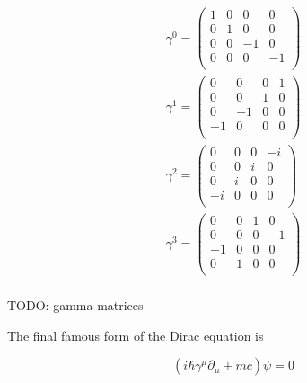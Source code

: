 \begin{equation*}
    \begin{gathered}
        \gamma^{0} = 
         \begin{pmatrix}
          1 & 0 & 0 & 0 \\
          0 & 1 & 0 & 0 \\
          0 & 0 & -1 & 0 \\
          0 & 0 & 0 & -1 \\
         \end{pmatrix} \\
        \gamma^{1} = 
         \begin{pmatrix}
          0 & 0 & 0 & 1 \\
          0 & 0 & 1 & 0 \\
          0 & -1 & 0 & 0 \\
          -1 & 0 & 0 & 0 \\
         \end{pmatrix} \\
        \gamma^{2} = 
         \begin{pmatrix}
          0 & 0 & 0 & -i \\
          0 & 0 & i & 0 \\
          0 & i & 0 & 0 \\
          -i & 0 & 0 & 0 \\
         \end{pmatrix} \\
        \gamma^{3} = 
         \begin{pmatrix}
          0 & 0 & 1 & 0 \\
          0 & 0 & 0 & -1 \\
          -1 & 0 & 0 & 0 \\
          0 & 1 & 0 & 0 \\
         \end{pmatrix} \\
    \end{gathered}
\end{equation*}

TODO: gamma matrices

The final famous form of the Dirac equation is

\begin{equation}
    \label{eq:dirac_original}
    ( i \hbar \gamma^{\mu} \partial_{\mu} + mc) \psi = 0
\end{equation}
